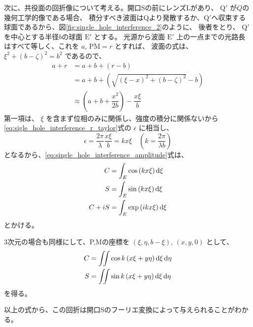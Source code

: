 \documentclass[../../../main]{subfiles}
\begin{document}
次に、共役面の回折像について考える。開口Sの前にレンズLがあり、 \( \mathrm{Q'} \) が\( Q \)の幾何工学的像である場合、
積分すべき波面はQより発散するか、\( \mathrm{Q'} \)へ収束する球面であるから、図\ref{fig:single_hole_interference_2}のように、
後者をとり、 \( \mathrm{Q'} \) を中心とする半径\( b \)の球面 \( \mathrm{E'} \) とする。
光源から波面 \( \mathrm{E'} \) 上の一点までの光路長はすべて等しく、これを \( a \), \( \overline{\mathrm{PM}} = r \) とすれば、
波面の式は、 \( \xi^2 + \left( b - \zeta \right)^2 = b^2 \) であるので、
\begin{align}
	a + r & = a + b + (r - b)                                                                            \nonumber \\
	      & = a + b + \left( \sqrt{ \left( \xi - x \right)^2 + \left( b - \zeta \right)^2 } - b  \right) \nonumber \\
	      & \approx \left( a + b + \dfrac{x^2}{2b}  \right) - \dfrac{x \xi}{b}
\end{align}
第一項は、 \( \xi \) を含まず位相のみに関係し、強度の積分に関係ないから\ref{eq:sigle_hole_interference_r_taylor}式の \( \overline{\epsilon} \) に相当し、
\begin{equation}
	\epsilon = \dfrac{2\pi}{\lambda} \dfrac{x \xi}{b} = kx \xi \quad \left(k = \dfrac{2\pi}{\lambda b}\right)
\end{equation}
となるから、\ref{eq:single_hole_interference_amplitude}式は、
\begin{equation}
	\begin{aligned}
		C      & = \int_E \cos \left( kx \xi \right) \odif{\xi}  \\
		S      & = \int_E \sin \left( kx \xi \right) \odif{\xi}  \\
		C + iS & = \int_E \exp \left( ikx \xi \right) \odif{\xi}
	\end{aligned}
\end{equation}
とかける。

3次元の場合も同様にして、P,Mの座標を \( (\xi, \eta, b - \xi) \), \( (x, y, 0) \) として、
\begin{equation}
	\begin{aligned}
		C & = \iint  \cos k \left( x \xi + y \eta \right) \odif{\xi} \odif{\eta} \\
		S & = \iint  \sin k \left( x \xi + y \eta \right) \odif{\xi} \odif{\eta}
	\end{aligned}
\end{equation}
を得る。

以上の式から、この回折は開口Sのフーリエ変換によって与えられることがわかる。
\end{document}
